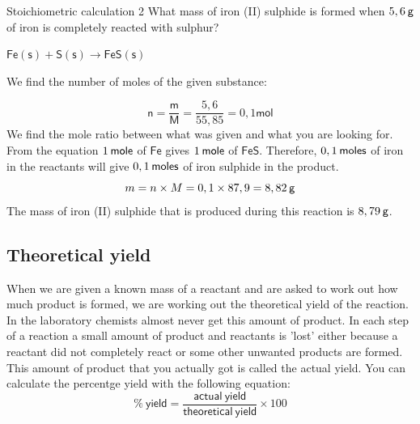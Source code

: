       \begin{wex}{Stoichiometric calculation 2 }
{
      \label{m38712*probfhsst!!!underscore!!!id1973}
      \label{m38712*id284347}What mass of iron (II) sulphide is formed when $5,6\phantom{\rule{2pt}{0ex}}\mathsf{g}$ of iron is completely reacted with sulphur?
      \vspace{5pt} }
{
      \label{m38712*id284378}$\mathsf{Fe}\left(\mathsf{s}\right)+\mathsf{S}\left(\mathsf{s}\right)\to \mathsf{FeS}\left(\mathsf{s}\right)$
       
       We find the number of moles of the given substance:  
      \label{m38712*id284430}\nopagebreak\noindent{}
        
    \begin{equation*}
    \mathsf{n}=\frac{\mathsf{m}}{\mathsf{M}}=\frac{5,6}{55,85}=0,1\mathsf{mol}
      \end{equation*}
       We find the mole ratio between what was given and what you are looking for. From the equation $1\phantom{\rule{2pt}{0ex}}\mathsf{mole}$ of $\mathsf{Fe}$ gives $1\phantom{\rule{2pt}{0ex}}\mathsf{mole}$ of $\mathsf{FeS}$. Therefore, $0,1\phantom{\rule{2pt}{0ex}}\mathsf{moles}$ of iron in the reactants will give $0,1\phantom{\rule{2pt}{0ex}}\mathsf{moles}$ of iron sulphide in the product. 
      \label{m38712*id284499}\nopagebreak\noindent{}
    \begin{equation*}
    m=n\ensuremath{\times}M=0,1\ensuremath{\times}87,9=8,82\phantom{\rule{2pt}{0ex}}\mathsf{g}
      \end{equation*}
      \label{m38712*id284548}The mass of iron (II) sulphide that is produced during this reaction is $8,79\phantom{\rule{2pt}{0ex}}\mathsf{g}$. 
}
    \end{wex}
    \noindent \vspace{-1cm}
\subsection*{Theoretical yield}
\label{m38712*eip-943}When we are given a known mass of a reactant and are asked to work out how much product is formed, we are working out the theoretical yield of the reaction. In the laboratory chemists almost never get this amount of product. In each step of a reaction a small amount of product and reactants is 'lost' either because a reactant did not completely react or some other unwanted products are formed. This amount of product that you actually got is called the actual yield. You can calculate the percentge yield with the following equation:
\begin{equation*}
 \mathsf{\% ~yield} = \frac{\mathsf{actual ~yield}}{\mathsf{theoretical ~yield}} \times 100
\end{equation*}

